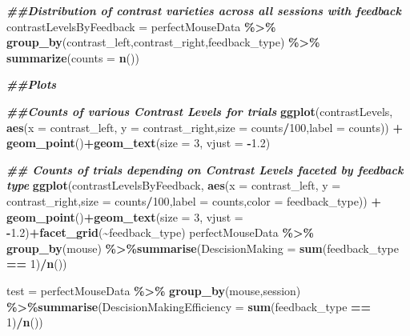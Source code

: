 \documentclass[
]{article}
\newenvironment{Shaded}{\begin{snugshade}}{\end{snugshade}}
\newcommand{\AttributeTok}[1]{\textcolor[rgb]{0.13,0.29,0.53}{#1}}
\newcommand{\DecValTok}[1]{\textcolor[rgb]{0.00,0.00,0.81}{#1}}
\newcommand{\DocumentationTok}[1]{\textcolor[rgb]{0.56,0.35,0.01}{\textbf{\textit{#1}}}}
\newcommand{\FloatTok}[1]{\textcolor[rgb]{0.00,0.00,0.81}{#1}}
\newcommand{\FunctionTok}[1]{\textcolor[rgb]{0.13,0.29,0.53}{\textbf{#1}}}
\newcommand{\NormalTok}[1]{#1}
\newcommand{\OtherTok}[1]{\textcolor[rgb]{0.56,0.35,0.01}{#1}}
\newcommand{\SpecialCharTok}[1]{\textcolor[rgb]{0.81,0.36,0.00}{\textbf{#1}}}
\begin{document}
\begin{Shaded}
\begin{Highlighting}[]
\DocumentationTok{\#\#Distribution of contrast varieties across all sessions with feedback}
\NormalTok{contrastLevelsByFeedback }\OtherTok{=}\NormalTok{ perfectMouseData }\SpecialCharTok{\%\textgreater{}\%} \FunctionTok{group\_by}\NormalTok{(contrast\_left,contrast\_right,feedback\_type) }\SpecialCharTok{\%\textgreater{}\%} \FunctionTok{summarize}\NormalTok{(}\AttributeTok{counts =} \FunctionTok{n}\NormalTok{()) }






\DocumentationTok{\#\#Plots}

\DocumentationTok{\#\#Counts of various Contrast Levels for trials}
\FunctionTok{ggplot}\NormalTok{(contrastLevels, }\FunctionTok{aes}\NormalTok{(}\AttributeTok{x =}\NormalTok{ contrast\_left, }\AttributeTok{y =}\NormalTok{ contrast\_right,}\AttributeTok{size =}\NormalTok{ counts}\SpecialCharTok{/}\DecValTok{100}\NormalTok{,}\AttributeTok{label =}\NormalTok{ counts)) }\SpecialCharTok{+}
  \FunctionTok{geom\_point}\NormalTok{()}\SpecialCharTok{+}\FunctionTok{geom\_text}\NormalTok{(}\AttributeTok{size =} \DecValTok{3}\NormalTok{, }\AttributeTok{vjust =} \SpecialCharTok{{-}}\FloatTok{1.2}\NormalTok{)}

\DocumentationTok{\#\# Counts of trials depending on Contrast Levels faceted by feedback type}
\FunctionTok{ggplot}\NormalTok{(contrastLevelsByFeedback, }\FunctionTok{aes}\NormalTok{(}\AttributeTok{x =}\NormalTok{ contrast\_left, }\AttributeTok{y =}\NormalTok{ contrast\_right,}\AttributeTok{size =}\NormalTok{ counts}\SpecialCharTok{/}\DecValTok{100}\NormalTok{,}\AttributeTok{label =}\NormalTok{ counts,}\AttributeTok{color =}\NormalTok{ feedback\_type)) }\SpecialCharTok{+}
  \FunctionTok{geom\_point}\NormalTok{()}\SpecialCharTok{+}\FunctionTok{geom\_text}\NormalTok{(}\AttributeTok{size =} \DecValTok{3}\NormalTok{, }\AttributeTok{vjust =} \SpecialCharTok{{-}}\FloatTok{1.2}\NormalTok{)}\SpecialCharTok{+}\FunctionTok{facet\_grid}\NormalTok{(}\SpecialCharTok{\textasciitilde{}}\NormalTok{feedback\_type)}
\NormalTok{perfectMouseData }\SpecialCharTok{\%\textgreater{}\%} \FunctionTok{group\_by}\NormalTok{(mouse) }\SpecialCharTok{\%\textgreater{}\%}\FunctionTok{summarise}\NormalTok{(}\AttributeTok{DescisionMaking =} \FunctionTok{sum}\NormalTok{(feedback\_type }\SpecialCharTok{==} \DecValTok{1}\NormalTok{)}\SpecialCharTok{/}\FunctionTok{n}\NormalTok{()) }

\NormalTok{test }\OtherTok{=}\NormalTok{ perfectMouseData }\SpecialCharTok{\%\textgreater{}\%} \FunctionTok{group\_by}\NormalTok{(mouse,session) }\SpecialCharTok{\%\textgreater{}\%}\FunctionTok{summarise}\NormalTok{(}\AttributeTok{DescisionMakingEfficiency =} \FunctionTok{sum}\NormalTok{(feedback\_type }\SpecialCharTok{==} \DecValTok{1}\NormalTok{)}\SpecialCharTok{/}\FunctionTok{n}\NormalTok{()) }


\end{Highlighting}
\end{Shaded}
\end{document}
